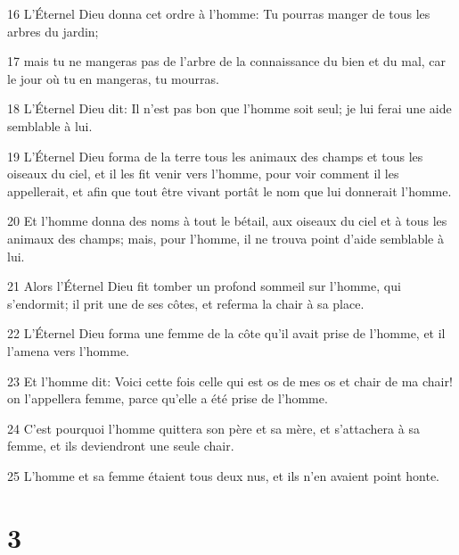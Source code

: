 \par 16 L'Éternel Dieu donna cet ordre à l'homme: Tu pourras manger de tous les arbres du jardin;
\par 17 mais tu ne mangeras pas de l'arbre de la connaissance du bien et du mal, car le jour où tu en mangeras, tu mourras.
\par 18 L'Éternel Dieu dit: Il n'est pas bon que l'homme soit seul; je lui ferai une aide semblable à lui.
\par 19 L'Éternel Dieu forma de la terre tous les animaux des champs et tous les oiseaux du ciel, et il les fit venir vers l'homme, pour voir comment il les appellerait, et afin que tout être vivant portât le nom que lui donnerait l'homme.
\par 20 Et l'homme donna des noms à tout le bétail, aux oiseaux du ciel et à tous les animaux des champs; mais, pour l'homme, il ne trouva point d'aide semblable à lui.
\par 21 Alors l'Éternel Dieu fit tomber un profond sommeil sur l'homme, qui s'endormit; il prit une de ses côtes, et referma la chair à sa place.
\par 22 L'Éternel Dieu forma une femme de la côte qu'il avait prise de l'homme, et il l'amena vers l'homme.
\par 23 Et l'homme dit: Voici cette fois celle qui est os de mes os et chair de ma chair! on l'appellera femme, parce qu'elle a été prise de l'homme.
\par 24 C'est pourquoi l'homme quittera son père et sa mère, et s'attachera à sa femme, et ils deviendront une seule chair.
\par 25 L'homme et sa femme étaient tous deux nus, et ils n'en avaient point honte.

\chapter{3}

